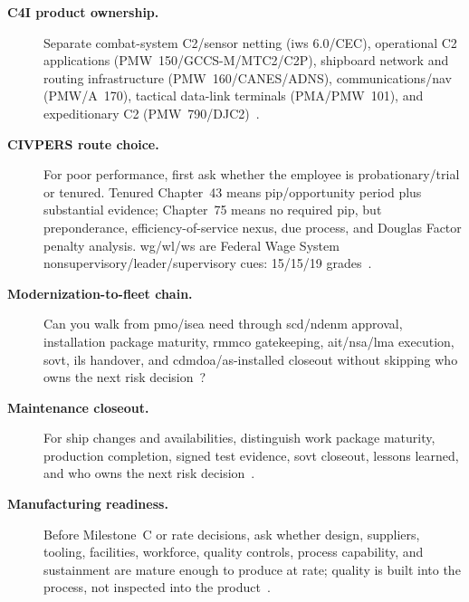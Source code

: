 \documentclass[../main.tex]{subfiles}
\begin{document}
\begin{description}
  \item[\textbf{C4I product ownership.}] Separate combat-system C2/sensor netting (\ac{iws} 6.0/CEC), operational C2 applications (PMW~150/GCCS-M/MTC2/C2P), shipboard network and routing infrastructure (PMW~160/CANES/ADNS), communications/nav (PMW/A~170), tactical data-link terminals (PMA/PMW~101), and expeditionary C2 (PMW~790/DJC2)~\autocite{navsea-cec-enhancing-battlefield-awareness-2025,PEOC4I-PMW150-tearsheet-2026,PEOC4I-PMW160-tearsheet-2025,PEOC4I-PMW170-tearsheet-2025,PEOC4I-PMA-PMW101-tearsheet-2025,PEOC4I-PMW790-tearsheet-2025}.
  \item[\textbf{CIVPERS route choice.}] For poor performance, first ask whether the employee is probationary/trial or tenured. Tenured Chapter~43 means \ac{pip}/opportunity period plus substantial evidence; Chapter~75 means no required \ac{pip}, but preponderance, efficiency-of-service nexus, due process, and Douglas Factor penalty analysis. \ac{wg}/\ac{wl}/\ac{ws} are Federal Wage System nonsupervisory/leader/supervisory cues: 15/15/19 grades~\autocite{opm-performance-management-federal-employees-2026,opm-probationary-periods-2025,opm-employee-rights-appeals,ecfr-5cfr-532-203}.
  \item[\textbf{Modernization-to-fleet chain.}] Can you walk from \ac{pmo}/\ac{isea} need through \ac{scd}/\ac{ndenm} approval, installation package maturity, \ac{rmmco} gatekeeping, \ac{ait}/\ac{nsa}/\ac{lma} execution, \ac{sovt}, \ac{ils} handover, and \ac{cdmdoa}/as-installed closeout without skipping who owns the next risk decision~\autocite{JFMM-VolVI-RevD-Chg5-2025,TS9090-310,NAVSEA-Logistics-Planning-Processes-Policy-2026,edo-4-1-2-navy-modernization-2025,edo-4-1-4-ait-fundamentals-2025}?
  \item[\textbf{Maintenance closeout.}] For ship changes and availabilities, distinguish work package maturity, production completion, signed test evidence, \ac{sovt} closeout, lessons learned, and who owns the next risk decision~\autocite{COMFLTFORCOMINST4790-3,TS9090-310,edo-4-2-1-cno-availability-planning-2025,edo-4-2-2-cno-availability-execution-2025}.
  \item[\textbf{Manufacturing readiness.}] Before Milestone~C or rate decisions, ask whether design, suppliers, tooling, facilities, workforce, quality controls, process capability, and sustainment are mature enough to produce at rate; quality is built into the process, not inspected into the product~\autocite{edo-3-7-1-manufacturing-producibility-2025,edo-3-7-2-production-quality-manufacturing-2026,DoD-MRL-Deskbook-2025,DoD-Producibility-Manufacturability-Guide-2024}.
\end{description}
\end{document}
